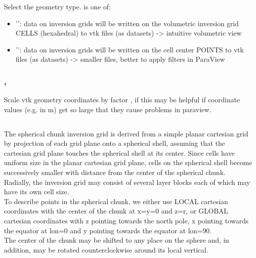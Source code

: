 \subsubsection{}
Select the geometry type.  is one of:
\begin{itemize}
\item[]'': data on inversion grids will be written on the volumetric inversion grid CELLS (hexahedral) to vtk files (as  datasets) -> intuitive volumetric view
\item[]'': data on inversion grids will be written on the cell center POINTS to vtk files (as  datasets) -> smaller files, better to apply filters in ParaView
\end{itemize}
\subsubsection{, }
Scale vtk geometry coordinates by factor , if 
this may be helpful if coordinate values (e.g. in m) get so large that they cause problems in paraview.
%
\subsection{} \label{basic_steps,sec:invgrid,sub:schunk}
The spherical chunk inversion grid is derived from a simple planar cartesian
grid by projection of each grid plane onto a spherical shell, assuming that
the cartesian grid plane touches the spherical shell at its center.
Since cells have uniform size in the planar cartesian grid plane, cells
on the spherical shell become successively smaller with distance from the 
center of the spherical chunk. Radially, the inversion grid may consist of
several layer blocks each of which may have its own cell size.\\
To describe points in the spherical chunk, we either use LOCAL cartesian coordinates
with the center of the chunk at x=y=0 and z=r, or GLOBAL cartesian coordinates
with z pointing towards the north pole, x pointing towards the equator at lon=0
and y pointing towards the equator at lon=90.\\
The center of the chunk may be shifted to any place on the sphere and, in addition,
may be rotated counterclockwise around its local vertical.

